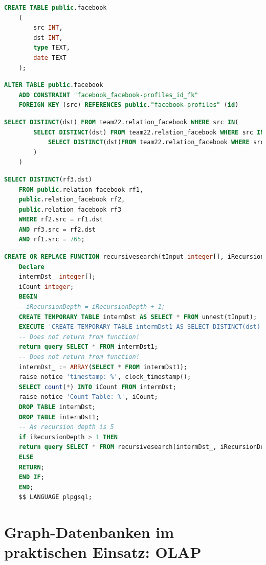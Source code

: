 \begin{lstlisting}[language=SQL,caption=Anlegen der Tabelle facebook,frame=single]
    CREATE TABLE public.facebook
    (
        src INT,
        dst INT,
        type TEXT,
        date TEXT
    );
\end{lstlisting}

\begin{lstlisting}[language=SQL,caption=Hinzufügen von Fremdschlüsseln,frame=single]
    ALTER TABLE public.facebook
    ADD CONSTRAINT "facebook_facebook-profiles_id_fk"
    FOREIGN KEY (src) REFERENCES public."facebook-profiles" (id)
\end{lstlisting}

\begin{lstlisting}[language=SQL,caption = Verschachteltes SELECT Statement,frame=single,label={SELECT} ]
    SELECT DISTINCT(dst) FROM team22.relation_facebook WHERE src IN(
        SELECT DISTINCT(dst) FROM team22.relation_facebook WHERE src IN(
            SELECT DISTINCT(dst)FROM team22.relation_facebook WHERE src IN(1)
        )
    )
\end{lstlisting}

\begin{lstlisting}[language=SQL,caption = Rekursiver JOIN,frame=single, label={JOIN} ]
    SELECT DISTINCT(rf3.dst)
    FROM public.relation_facebook rf1,
    public.relation_facebook rf2,
    public.relation_facebook rf3
    WHERE rf2.src = rf1.dst
    AND rf3.src = rf2.dst
    AND rf1.src = 765;
\end{lstlisting}
\newpage
\begin{lstlisting}[language=SQL,caption = Selbstgeschriebenes Stored Procedure,frame=single, label={recursiveFunction} ]
    CREATE OR REPLACE FUNCTION recursivesearch(tInput integer[], iRecursionDepth integer, sTable text) RETURNS SETOF integer AS $$
    Declare
    intermDst_ integer[];
    iCount integer;
    BEGIN
    --iRecursionDepth = iRecursionDepth + 1;
    CREATE TEMPORARY TABLE intermDst AS SELECT * FROM unnest(tInput);
    EXECUTE 'CREATE TEMPORARY TABLE intermDst1 AS SELECT DISTINCT(dst) FROM ' || sTable || ' WHERE src IN (SELECT * FROM intermDst)';
    -- Does not return from function!
    return query SELECT * FROM intermDst1;
    -- Does not return from function!
    intermDst_ := ARRAY(SELECT * FROM intermDst1);
    raise notice 'timestamp: %', clock_timestamp();
    SELECT count(*) INTO iCount FROM intermDst;
    raise notice 'Count Table: %', iCount;
    DROP TABLE intermDst;
    DROP TABLE intermDst1;
    -- As recursion depth is 5
    if iRecursionDepth > 1 THEN
    return query SELECT * FROM recursivesearch(intermDst_, iRecursionDepth - 1, sTable);
    ELSE
    RETURN;
    END IF;
    END;
    $$ LANGUAGE plpgsql;
\end{lstlisting}

\section{Graph-Datenbanken im praktischen Einsatz: OLAP}
